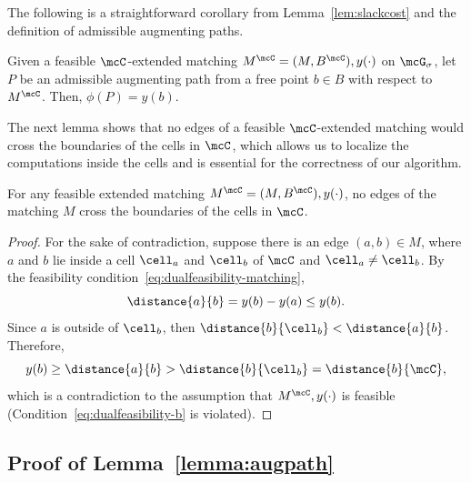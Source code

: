 The following is a straightforward corollary from Lemma~\ref{lem:slackcost} and the definition of admissible augmenting paths.

\begin{corollary}
\label{cor:slackcost}
Given a feasible $\mcC$-extended matching $M^{\mcC} = (M, B^{\mcC}),y(\cdot)$ on $\mcG_\sigma$, let $P$ be an admissible augmenting path from a free point $b\in B$ with respect to $M^{\mcC}$. Then, $\phi(P)= y(b)$.
\end{corollary}

The next lemma shows that no edges of a feasible $\mcC$-extended matching would cross the boundaries of the cells in $\mcC$, which allows us to localize the computations inside the cells and is essential for the correctness of our algorithm.

\begin{lemma}\label{lemma:no-cross}
    For any feasible extended matching $M^\mcC=(M, B^\mcC), y(\cdot)$, no edges of the matching $M$ cross the boundaries of the cells in $\mcC$.
\end{lemma}
\begin{proof}
    For the sake of contradiction, suppose there is an edge $(a,b)\in M$, where $a$ and $b$ lie inside a cell $\cell_a$ and $\cell_b$ of $\mcC$ and $\cell_a\neq \cell_b$. By the feasibility condition~\eqref{eq:dualfeasibility-matching},
    \begin{equation*}
        \distance{a}{b} = y(b) - y(a) \le y(b).
    \end{equation*}
    Since $a$ is outside of $\cell_b$, then $\distance{b}{\cell_b}<\distance{a}{b}$. Therefore, 
    \[y(b)\ge \distance{a}{b}> \distance{b}{\cell_b}=\distance{b}{\mcC},\]
    which is a contradiction to the assumption that $M^\mcC, y(\cdot)$ is feasible (Condition~\eqref{eq:dualfeasibility-b} is violated).
\end{proof}


\subsection{Proof of Lemma~\ref{lemma:augpath}}

\netcost*

